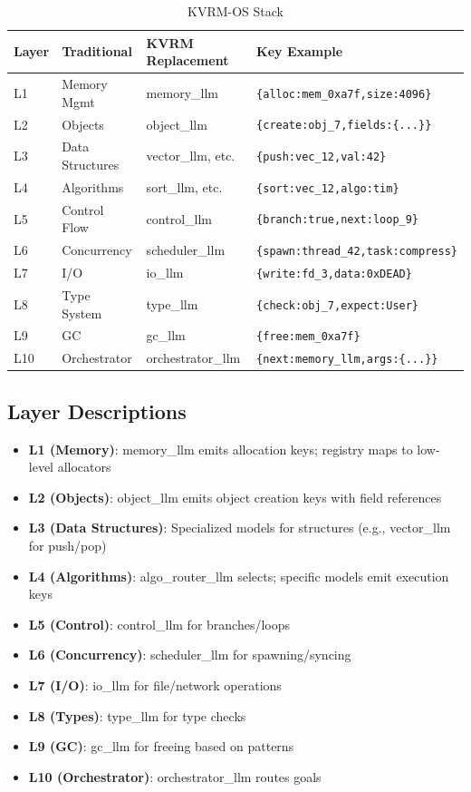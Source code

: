 \documentclass[11pt,a4paper]{article}
\begin{document}
\begin{table}[h]
\caption{KVRM-OS Stack}
\label{tab:stack}
\centering
\small
\begin{tabular}{@{}llll@{}}
\toprule
Layer & Traditional & KVRM Replacement & Key Example \\
\midrule
L1 & Memory Mgmt & memory\_llm & \texttt{\{alloc:mem\_0xa7f,size:4096\}} \\
L2 & Objects & object\_llm & \texttt{\{create:obj\_7,fields:\{...\}\}} \\
L3 & Data Structures & vector\_llm, etc. & \texttt{\{push:vec\_12,val:42\}} \\
L4 & Algorithms & sort\_llm, etc. & \texttt{\{sort:vec\_12,algo:tim\}} \\
L5 & Control Flow & control\_llm & \texttt{\{branch:true,next:loop\_9\}} \\
L6 & Concurrency & scheduler\_llm & \texttt{\{spawn:thread\_42,task:compress\}} \\
L7 & I/O & io\_llm & \texttt{\{write:fd\_3,data:0xDEAD\}} \\
L8 & Type System & type\_llm & \texttt{\{check:obj\_7,expect:User\}} \\
L9 & GC & gc\_llm & \texttt{\{free:mem\_0xa7f\}} \\
L10 & Orchestrator & orchestrator\_llm & \texttt{\{next:memory\_llm,args:\{...\}\}} \\
\bottomrule
\end{tabular}
\end{table}

\subsection{Layer Descriptions}

\begin{itemize}
    \item \textbf{L1 (Memory)}: memory\_llm emits allocation keys; registry maps to low-level allocators
    \item \textbf{L2 (Objects)}: object\_llm emits object creation keys with field references
    \item \textbf{L3 (Data Structures)}: Specialized models for structures (e.g., vector\_llm for push/pop)
    \item \textbf{L4 (Algorithms)}: algo\_router\_llm selects; specific models emit execution keys
    \item \textbf{L5 (Control)}: control\_llm for branches/loops
    \item \textbf{L6 (Concurrency)}: scheduler\_llm for spawning/syncing
    \item \textbf{L7 (I/O)}: io\_llm for file/network operations
    \item \textbf{L8 (Types)}: type\_llm for type checks
    \item \textbf{L9 (GC)}: gc\_llm for freeing based on patterns
    \item \textbf{L10 (Orchestrator)}: orchestrator\_llm routes goals
\end{itemize}
\end{document}
